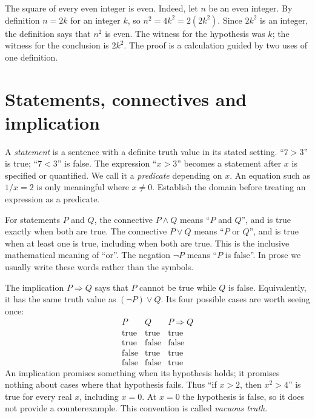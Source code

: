 \begin{examplex}
The square of every even integer is even. Indeed, let $n$ be an even integer. By definition
$n=2k$ for an integer $k$, so $n^2=4k^2=2(2k^2)$. Since $2k^2$ is an integer, the definition
says that $n^2$ is even. The witness for the hypothesis was $k$; the witness for the
conclusion is $2k^2$. The proof is a calculation guided by two uses of one definition.
\end{examplex}

\section{Statements, connectives and implication}

A \emph{statement} is a sentence with a definite truth value in its stated setting.
``$7>3$'' is true; ``$7<3$'' is false. The expression ``$x>3$'' becomes a statement
after $x$ is specified or quantified. We call it a \emph{predicate} depending on $x$.
An equation such as $1/x=2$ is only meaningful where $x\ne0$. Establish the domain
before treating an expression as a predicate.

For statements $P$ and $Q$, the connective $P\land Q$ means ``$P$ and $Q$'', and is
true exactly when both are true. The connective $P\lor Q$ means ``$P$ or $Q$'', and
is true when at least one is true, including when both are true. This is the inclusive
mathematical meaning of ``or''. The negation $\neg P$ means ``$P$ is false''.
In prose we usually write these words rather than the symbols.

The implication $P\Rightarrow Q$ says that $P$ cannot be true while $Q$ is false.
Equivalently, it has the same truth value as $(\neg P)\lor Q$.
Its four possible cases are worth seeing once:
\[
\begin{array}{c|c|c}
P&Q&P\Rightarrow Q\\\hline
\text{true}&\text{true}&\text{true}\\
\text{true}&\text{false}&\text{false}\\
\text{false}&\text{true}&\text{true}\\
\text{false}&\text{false}&\text{true}
\end{array}
\]
An implication promises something when its hypothesis holds; it promises nothing
about cases where that hypothesis fails. Thus ``if $x>2$, then $x^2>4$'' is true
for every real $x$, including $x=0$. At $x=0$ the hypothesis is false, so it does
not provide a counterexample. This convention is called \emph{vacuous truth}.


